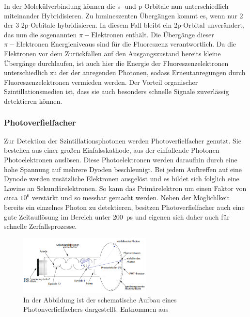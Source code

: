                 In der Molekülverbindung können die s- und p-Orbitale nun unterschiedlich miteinander Hybridisieren. Zu lumineszenten Übergängen kommt es, wenn nur 2 der 3 2p-Orbitale hybridisieren. In diesem
                Fall bleibt ein 2p-Orbital unverändert, das nun die sogenannten $\pi-\text{Elektronen}$ enthält. Die Übergänge dieser $\pi-\text{Elektronen}$ Energieniveaus sind für die Fluoreszenz verantwortlich.
                Da die Elektronen vor dem Zurückfallen auf den Ausgangszustand bereits kleine Übergänge durchlaufen, ist auch hier die Energie der Fluoreszenzelektronen unterschiedlich zu der der anregenden
                Photonen, sodass Erneutanregungen durch Fluoreszenzelektronen vermieden werden. Der Vorteil organischer Szintillationsmedien ist, dass sie auch besonders schnelle Signale zuverlässig 
                detektieren können.

            \subsubsection*{Photoverfielfacher}
                Zur Detektion der Szintillationsphotonen werden Photoverfielfacher genutzt. Sie bestehen aus einer großen Einfalsskathode, aus der einfallende Photonen Photoelektronen auslösen. Diese
                Photoelektronen werden daraufhin durch eine hohe Spannung auf mehrere Dyoden beschleunigt. Bei jedem Auftreffen auf eine Dynode werden zusätzliche Elektronen ausgelöst und es bildet sich 
                folglich eine Lawine an Sekundärelektronen. So kann das Primärelektron um einen Faktor von circa $10^6$ verstärkt und so messbar gemacht werden. Neben der Möglichlkeit bereits ein einzelnes 
                Photon zu detektieren, besitzen Photoverfielfacher auch eine gute Zeitauflösung im  Bereich unter \SI{200}{\pico\second} und eigenen sich daher auch für schnelle Zerfallsprozesse.

                \FloatBarrier

                \begin{figure}[h]
                  \centering
                  \includegraphics[width = 0.6\textwidth]{pictures/photomultiplier.png}
                  \caption{In der Abbildung ist der schematische Aufbau eines Photonverfielfachers dargestellt. Entnommen aus \cite{kolanoski_teilchendetektoren_2016}}
                  \label{fig:photomultiplier}
                \end{figure}
        
                \FloatBarrier
        
                \noindent 

